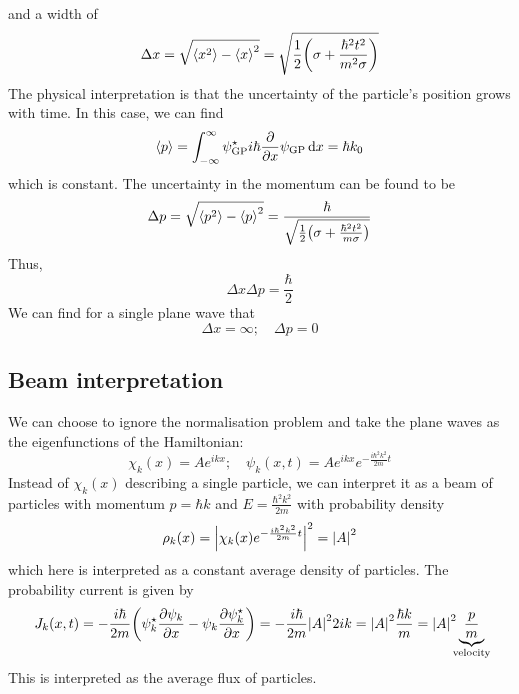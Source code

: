 and a width of
\[
	\Delta x = \sqrt{\left\langle{x^2}\right\rangle - \left\langle{x}\right\rangle^2} = \sqrt{\frac{1}{2} \qty(\sigma + \frac{\hbar^2 t^2}{m^2 \sigma})}
\]
The physical interpretation is that the uncertainty of the particle's position grows with time.
In this case, we can find
\[
	\left\langle{p}\right\rangle = \int_{-\infty}^\infty \psi_{\text{GP}}^\star i \hbar \pdv{x} \psi_{\text{GP}} \dd{x} = \hbar k_0
\]
which is constant.
The uncertainty in the momentum can be found to be
\[
	\Delta p = \sqrt{\left\langle{p^2}\right\rangle - \left\langle{p}\right\rangle^2} = \frac{\hbar}{\sqrt{\frac{1}{2} \qty(\sigma + \frac{\hbar^2 t^2}{m \sigma})}}
\]
Thus,
\[
	\Delta x \Delta p = \frac{\hbar}{2}
\]
We can find for a single plane wave that
\[
	\Delta x = \infty;\quad \Delta p = 0
\]

\subsection{Beam interpretation}
We can choose to ignore the normalisation problem and take the plane waves as the eigenfunctions of the Hamiltonian:
\[
	\chi_k(x) = Ae^{ikx};\quad \psi_k(x,t) = Ae^{ikx}e^{-\frac{i \hbar^2 k^2}{2m} t}
\]
Instead of \( \chi_k(x) \) describing a single particle, we can interpret it as a beam of particles with momentum \( p = \hbar k \) and \( E = \frac{\hbar^2 k^2}{2m} \) with probability density
\[
	\rho_k(x) = \abs{\chi_k(x) e^{-\frac{i\hbar^2 k^2}{2m}t}}^2 = \abs{A}^2
\]
which here is interpreted as a constant average density of particles.
The probability current is given by
\[
	J_k(x,t) = - \frac{i\hbar}{2m} \qty(\psi^\star_k \pdv{\psi_k}{x} - \psi_k \pdv{\psi_k^\star}{x}) = -\frac{i\hbar}{2m} \abs{A}^2 2ik = \abs{A}^2 \frac{\hbar k}{m} = \abs{A}^2 \underbrace{\frac{p}{m}}_{\mathclap{\text{velocity}}}
\]
This is interpreted as the average flux of particles.

